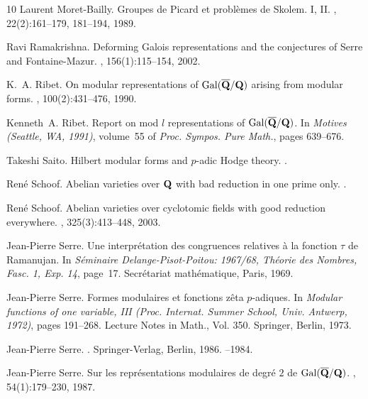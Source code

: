 \documentclass[12pt]{article}
\begin{document}
\begin{thebibliography}{10}
Laurent Moret-Bailly.
\newblock Groupes de {P}icard et probl\`emes de {S}kolem. {I}, {II}.
, 22(2):161--179, 181--194,
  1989.

\bibitem{[R02]}
Ravi Ramakrishna.
\newblock Deforming {G}alois representations and the conjectures of {S}erre and
  {F}ontaine-{M}azur.
, 156(1):115--154, 2002.

K.~A. Ribet.
\newblock On modular representations of {${\rm Gal}(\overline{\bf Q}/{\bf Q})$}
  arising from modular forms.
, 100(2):431--476, 1990.

Kenneth~A. Ribet.
\newblock Report on mod {$l$} representations of {${\rm Gal}(\overline{\bf
  Q}/{\bf Q})$}.
\newblock In {\em Motives (Seattle, WA, 1991)}, volume~55 of {\em Proc. Sympos.
  Pure Math.}, pages 639--676.

Takeshi Saito.
\newblock Hilbert modular forms and $p$-adic {H}odge theory.
.

Ren{\'e} Schoof.
\newblock Abelian varieties over {${\bf Q}$} with bad reduction in one prime
  only.
.

Ren{\'e} Schoof.
\newblock Abelian varieties over cyclotomic fields with good reduction
  everywhere.
, 325(3):413--448, 2003.

Jean-Pierre Serre.
\newblock Une interpr\'etation des congruences relatives \`a la fonction {$\tau
  $} de {R}amanujan.
\newblock In {\em S\'eminaire Delange-Pisot-Poitou: 1967/68, Th\'eorie des
  Nombres, Fasc. 1, Exp. 14}, page~17. Secr\'etariat math\'ematique, Paris,
  1969.

Jean-Pierre Serre.
\newblock Formes modulaires et fonctions z\^eta {$p$}-adiques.
\newblock In {\em Modular functions of one variable, III (Proc. Internat.
  Summer School, Univ. Antwerp, 1972)}, pages 191--268. Lecture Notes in Math.,
  Vol. 350. Springer, Berlin, 1973.

Jean-Pierre Serre.
.
\newblock Springer-Verlag, Berlin, 1986.
--1984.

Jean-Pierre Serre.
\newblock Sur les repr\'esentations modulaires de degr\'e {$2$} de {${\rm
  Gal}(\overline{\bf Q}/{\bf Q})$}.
, 54(1):179--230, 1987.


\end{thebibliography}
\end{document}
